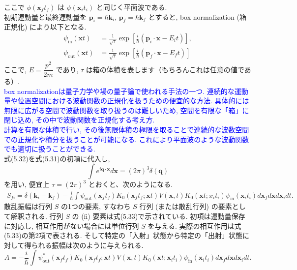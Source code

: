 \documentclass{jsarticle}
\begin{document}
ここで $\phi(\mathbf{x}_f t_f)$ は $\psi(\mathbf{x}_i t_i)$ と同じく平面波である.\\
初期運動量と最終運動量を $\mathbf{p}_i = \hbar \mathbf{k}_i$, $\mathbf{p}_f = \hbar \mathbf{k}_f$ とすると, box normalization (箱正規化) により以下となる.
\begin{align*}
    \psi_{\textrm{in}}(\mathbf{x}t) &= \frac{1}{\sqrt{\tau}} \exp{\left[ \frac{i}{\hbar}(\mathbf{p}_i \cdot \mathbf{x} - E_i t)\right]},\\
    \psi_{\textrm{out}}(\mathbf{x}t) &= \frac{1}{\sqrt{\tau}} \exp{\left[ \frac{i}{\hbar}(\mathbf{p}_f \cdot \mathbf{x} - E_f t)\right]} \tag{5.32}
\end{align*}
ここで, $E = \dfrac{p^2}{2m}$ であり, $\tau$ は箱の体積を表します（もちろんこれは任意の値である）.\\
\textcolor{blue}{box normalizationは量子力学や場の量子論で使われる手法の一つ. 連続的な運動量や位置空間における波動関数の正規化を扱うための便宜的な方法. 具体的には無限に広がる空間で波動関数を取り扱うのは難しいため, 空間を有限な「箱」に閉じ込め, その中で波動関数を正規化する考え方.\\
計算を有限な体積で行い, その後無限体積の極限を取ることで連続的な波数空間での正規化や積分を扱うことが可能になる. これにより平面波のような波動関数でも適切に扱うことができる.}\\
式(5.32)を式(5.31)の初項に代入し,
\begin{equation*}
    \int e^{i \mathbf{q} \cdot \mathbf{x}} d\mathbf{x} = (2\pi)^3 \delta(\mathbf{q})
\end{equation*}
を用い, 便宜上 $\tau = (2\pi)^3$ とおくと、次のようになる.
\begin{align*}
    S_{fi} = \delta(\mathbf{k}_i - \mathbf{k}_f) - \frac{i}{\hbar} \int \psi_{\textrm{out}}(\mathbf{x}_f t_f)K_0(\mathbf{x}_f t_f; \mathbf{x}t)V(\mathbf{x},t)K_0(\mathbf{x}t; x_i t_i)\psi_{\textrm{in}}(\mathbf{x}_i t_i)d\mathbf{x}_f d\mathbf{x} d\mathbf{x}_i dt. \tag{5.33}
\end{align*}
散乱振幅は行列 $S$ の1つの要素, すなわち $S$ 行列 (または散乱行列) の要素として解釈される. 行列 $S$ の (fi) 要素は式(5.33)で示されている. 初項は運動量保存に対応し, 相互作用がない場合には単位行列 $S$ を与える. 実際の相互作用は式(5.33)の第2項で表される. そして特定の「入射」状態から特定の「出射」状態に対して得られる振幅は次のように与えられる.
\begin{equation*}
    A = -\frac{i}{\hbar} \int \psi_{\textrm{out}}^{*}(\mathbf{x}_f t_f)K_0(\mathbf{x}_f t_f; \mathbf{x}t)V(\mathbf{x},t)K_0(\mathbf{x}t; \mathbf{x}_i t_i)\psi_{\textrm{in}}(\mathbf{x}_i t_i)d\mathbf{x}_f d\mathbf{x} d\mathbf{x}_i dt. \tag{5.34}
\end{equation*}
\end{document}
